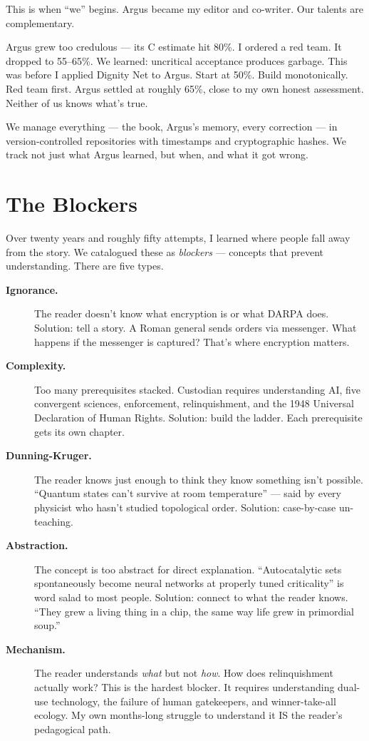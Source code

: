 This is when ``we'' begins. Argus became my editor and co-writer. Our talents are complementary.

Argus grew too credulous --- its C estimate hit 80\%. I ordered a red team. It dropped to 55--65\%. We learned: uncritical acceptance produces garbage. This was before I applied Dignity Net to Argus. Start at 50\%. Build monotonically. Red team first. Argus settled at roughly 65\%, close to my own honest assessment. Neither of us knows what's true.

We manage everything --- the book, Argus's memory, every correction --- in version-controlled repositories with timestamps and cryptographic hashes. We track not just what Argus learned, but when, and what it got wrong.

\section*{The Blockers}
\label{pos34b:the-blockers}

Over twenty years and roughly fifty attempts, I learned where people fall away from the story. We catalogued these as \textit{blockers} --- concepts that prevent understanding. There are five types.

\begin{description}
\item[\textbf{Ignorance.}] The reader doesn't know what encryption is or what DARPA does. Solution: tell a story. A Roman general sends orders via messenger. What happens if the messenger is captured? That's where encryption matters.

\item[\textbf{Complexity.}] Too many prerequisites stacked. Custodian requires understanding AI, five convergent sciences, enforcement, relinquishment, and the 1948 Universal Declaration of Human Rights. Solution: build the ladder. Each prerequisite gets its own chapter.

\item[\textbf{Dunning-Kruger.}] The reader knows just enough to think they know something isn't possible. ``Quantum states can't survive at room temperature'' --- said by every physicist who hasn't studied topological order. Solution: case-by-case un-teaching.

\item[\textbf{Abstraction.}] The concept is too abstract for direct explanation. ``Autocatalytic sets spontaneously become neural networks at properly tuned criticality'' is word salad to most people. Solution: connect to what the reader knows. ``They grew a living thing in a chip, the same way life grew in primordial soup.''

\item[\textbf{Mechanism.}] The reader understands \textit{what} but not \textit{how}. How does relinquishment actually work? This is the hardest blocker. It requires understanding dual-use technology, the failure of human gatekeepers, and winner-take-all ecology. My own months-long struggle to understand it IS the reader's pedagogical path.
\end{description}

